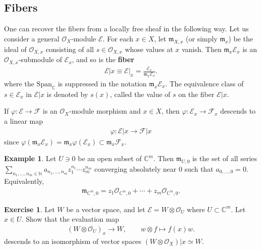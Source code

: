 \documentclass[12pt,a4paper,notitlepage]{article}
\theoremstyle{definition}
\newtheorem{eg}[df]{Example}
\newtheorem{exe}[df]{Exercise}
\theoremstyle{plain}
\newcommand{\fk}{\mathfrak}
\newcommand{\Span}{\mathrm{Span}}
\newcommand{\scr}{\mathscr}
\newcommand{\Cbb}{\mathbb C}
\newcommand{\Nbb}{\mathbb N}
\numberwithin{equation}{section}
\begin{document}
\subsection{Fibers}

One can recover the fibers from a locally free sheaf in the following way. Let us consider a general $\scr O_X$-module $\scr E$. For each $x\in X$, let $\fk m_{X,x}$ (or simply $\fk m_x$) \index{mx@$\fk m_{X,x}\equiv\fk m_x$} be the ideal of $\scr O_{X,x}$ consisting of all $s\in\scr O_{X,x}$ whose values at $x$ vanish. Then $\fk m_x\scr E_x$ is an $\scr O_{X,x}$-submodule of $\scr E_x$, and so is the \textbf{fiber} \index{Ex@$\scr E\lvert x=\scr E\lvert_x,s(x)$}
\begin{align}
\scr E|x\equiv\scr E|_x=\frac{\scr E_x}{\fk m_x\scr E_x}.
\end{align} 
where the $\Span_\Cbb$ is suppressed in the notation $\fk m_x\scr E_x$. The equivalence class of $s\in\scr E_x$ in $\scr E|x$ is denoted by $s(x)$, called the value of $s$ on the fiber $\scr E|x$.

If $\varphi:\scr E\rightarrow\scr F$ is an $\scr O_X$-module morphism and $x\in X$, then $\varphi:\scr E_x\rightarrow\scr F_x$ descends to a linear map
\begin{align}
	\varphi:\scr E|x\rightarrow\scr F|x	
\end{align}
since $\varphi(\fk m_x\scr E_x)=\fk m_x\varphi(\scr E_x)\subset\fk m_x\scr F_x$. 

\begin{eg}
Let $U\ni 0$ be an open subset of $\Cbb^m$. Then $\fk m_{U,0}$ is the set of all series $\sum_{n_1,\dots,n_m\in \Nbb}a_{n_1,\dots,n_m}z_1^{n_1}\cdots z_m^{n_m}$ converging absolutely near $0$ such that $a_{0,\dots,0}=0$. Equivalently,
\begin{align*}
\fk m_{\Cbb^m,0}=z_1\scr O_{\Cbb^m,0}+\cdots+z_m\scr O_{\Cbb^m,0}.	
\end{align*}
\end{eg}

\begin{exe}
Let $W$ be a vector space, and let $\scr E=W\otimes\scr O_U$ where $U\subset\Cbb^m$. Let $x\in U$.  Show that the evaluation map
\begin{align}
(W\otimes\scr O_U)_x\rightarrow W, \qquad w\otimes f\mapsto f(x)w.	
\end{align}
descends to an isomorphism of vector spaces $(W\otimes\scr O_X)\big|x\simeq W$.
\end{exe}
\end{document}
